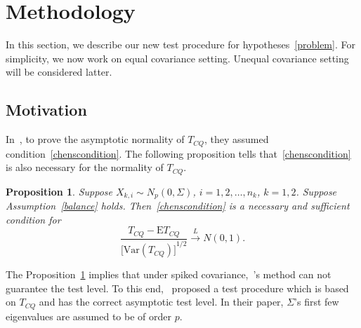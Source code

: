 \documentclass[review]{elsarticle}
\theoremstyle{plain}
\newtheorem{proposition}{\quad\quad Proposition}
\theoremstyle{definition}
\theoremstyle{remark}
\begin{document}
\section{Methodology}

In this section, we describe our new test procedure for hypotheses~\eqref{problem}. For simplicity, we now work on equal covariance setting. Unequal covariance setting will be considered latter.

\subsection{Motivation}

    In~\cite{Chen2010A}, to prove the asymptotic normality of $T_{CQ}$, they assumed condition~\eqref{chenscondition}.
    The following proposition tells that~\eqref{chenscondition} is also necessary for the normality of $T_{CQ}$.
\begin{proposition}\label{newIf}
    Suppose $X_{k,i}\sim N_p(0,\Sigma)$, $i=1,2,\ldots,n_k$, $k=1,2$. Suppose Assumption~\ref{balance} holds.
    Then~\eqref{chenscondition} is a necessary and sufficient condition for 
    \begin{equation}
        \frac{T_{CQ}-\mathrm{E}T_{CQ}}{{\big[\mathrm{Var}(T_{CQ})\big]}^{1/2}}\xrightarrow{L}N(0,1).
    \end{equation}
\end{proposition}
The Proposition~\ref{newIf} implies that under spiked covariance,~\cite{Chen2010A}'s method can not guarantee the test level.
To this end,~\cite{Ma2015A} proposed a test procedure which is based on $T_{CQ}$ and has the correct asymptotic test level.
In their paper, $\Sigma$'s first few eigenvalues are assumed to be of order $p$.
\end{document}
